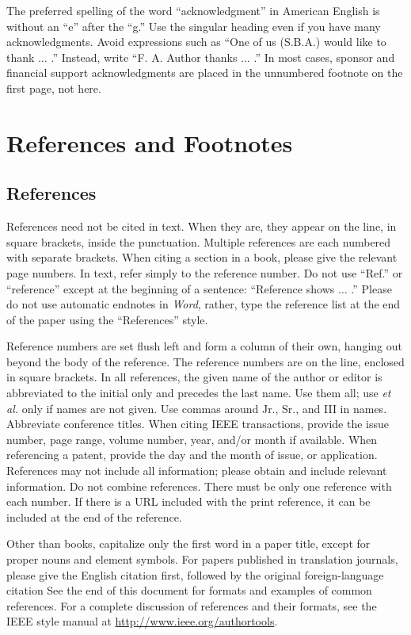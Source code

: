 \documentclass[twoside,web]{ieeecolor}
\begin{document}
The preferred spelling of the word ``acknowledgment'' in American English is 
without an ``e'' after the ``g.'' Use the singular heading even if you have 
many acknowledgments. Avoid expressions such as ``One of us (S.B.A.) would 
like to thank $\ldots$ .'' Instead, write ``F. A. Author thanks $\ldots$ .'' In most 
cases, sponsor and financial support acknowledgments are placed in the 
unnumbered footnote on the first page, not here.

\section*{References and Footnotes}

\subsection{References}
References need not be cited in text. When they are, they appear on the 
line, in square brackets, inside the punctuation. Multiple references are 
each numbered with separate brackets. When citing a section in a book, 
please give the relevant page numbers. In text, refer simply to the 
reference number. Do not use ``Ref.'' or ``reference'' except at the 
beginning of a sentence: ``Reference \cite{b3} shows $\ldots$ .'' Please do not use 
automatic endnotes in \emph{Word}, rather, type the reference list at the end of the 
paper using the ``References'' style.

Reference numbers are set flush left and form a column of their own, hanging 
out beyond the body of the reference. The reference numbers are on the line, 
enclosed in square brackets. In all references, the given name of the author 
or editor is abbreviated to the initial only and precedes the last name. Use 
them all; use \emph{et al.} only if names are not given. Use commas around Jr., 
Sr., and III in names. Abbreviate conference titles. When citing IEEE 
transactions, provide the issue number, page range, volume number, year, 
and/or month if available. When referencing a patent, provide the day and 
the month of issue, or application. References may not include all 
information; please obtain and include relevant information. Do not combine 
references. There must be only one reference with each number. If there is a 
URL included with the print reference, it can be included at the end of the 
reference. 

Other than books, capitalize only the first word in a paper title, except 
for proper nouns and element symbols. For papers published in translation 
journals, please give the English citation first, followed by the original 
foreign-language citation See the end of this document for formats and 
examples of common references. For a complete discussion of references and 
their formats, see the IEEE style manual at
\underline{http://www.ieee.org/authortools}.
\end{document}
